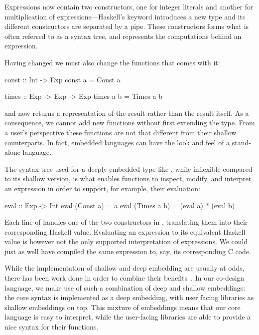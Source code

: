 \documentclass[../paper.tex]{subfiles}
\begin{document}
\noindent Expressions now contain two constructors, one for integer literals and another for multiplication of expressions---Haskell's  keyword introduces a new type and its different constructors are separated by a pipe. These constructors forms what is often referred to as a syntax tree, and represents the computations behind an expression.

Having changed  we must also change the functions that comes with it:

\begin{code}
const :: Int -> Exp
const a = Const a

times :: Exp -> Exp -> Exp
times a b = Times a b
\end{code}

\noindent {} and  now returns a representation of the result rather than the result itself. As a consequence, we cannot add new functions without first extending the  type. From a user's perspective these functions are not that different from their shallow counterparts. In fact, embedded languages can have the look and feel of a stand-alone language. %

The syntax tree used for a deeply embedded type like , while inflexible compared to its shallow version, is what enables functions to inspect, modify, and interpret an expression in order to support, for example, their evaluation:

\begin{code}
eval :: Exp -> Int
eval (Const a)   = a
eval (Times a b) = (eval a) * (eval b)
\end{code}

\noindent Each line of  handles one of the two constructors in , translating them into their corresponding Haskell value. Evaluating an expression to its equivalent Haskell value is however not the only supported interpretation of expressions. We could just as well have compiled the same expression to, say, its corresponding C code.

While the implementation of shallow and deep embedding are usually at odds, there has been work done in order to combine their benefits~\cite{svenningsson2012}. In our co-design language, we make use of such a combination of deep and shallow embeddings: the core syntax is implemented as a deep embedding, with user facing libraries as shallow embeddings on top. This mixture of embeddings means that our core language is easy to interpret, while the user-facing libraries are able to provide a nice syntax for their functions.
\end{document}
